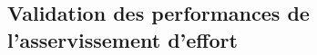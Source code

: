 \documentclass[10pt,fleqn]{article} %
\begin{document}
\begin{multicols}{2}
\subsection{Validation des performances de l’asservissement d’effort}
%
%
%
%
%
%
%
%
%
%



\end{multicols}
\end{document}
